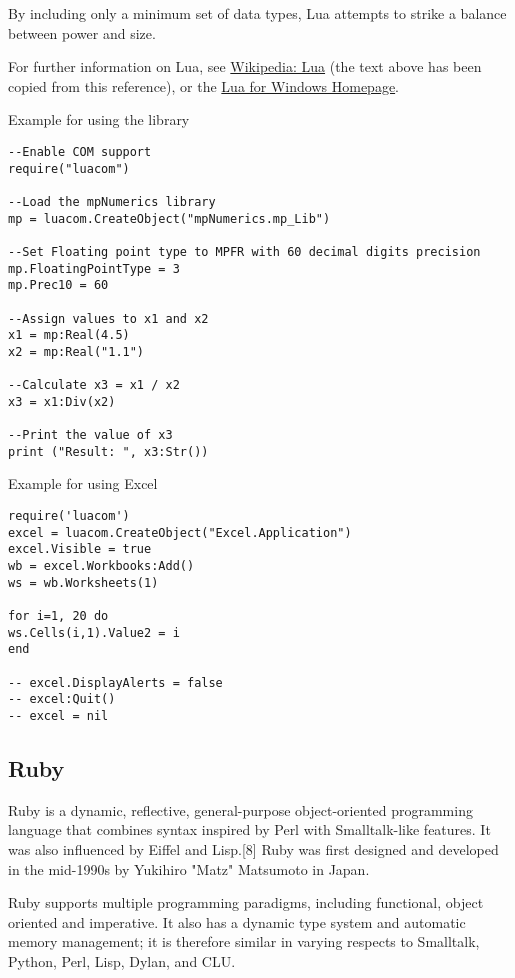 \vpara
By including only a minimum set of data types, Lua attempts to strike a balance between power and size.

For further information on Lua, see \href{http://en.wikipedia.org/wiki/Lua_(programming_language)}{Wikipedia: Lua} (the text above has been copied from this reference), or the  \href{http://code.google.com/p/luaforwindows/}{Lua for Windows Homepage}.


\vpara
Example for using the library

\begin{lstlisting}
--Enable COM support
require("luacom")

--Load the mpNumerics library
mp = luacom.CreateObject("mpNumerics.mp_Lib")

--Set Floating point type to MPFR with 60 decimal digits precision
mp.FloatingPointType = 3
mp.Prec10 = 60

--Assign values to x1 and x2
x1 = mp:Real(4.5)
x2 = mp:Real("1.1")

--Calculate x3 = x1 / x2
x3 = x1:Div(x2)

--Print the value of x3
print ("Result: ", x3:Str())
\end{lstlisting}


\vpara
Example for using Excel

\begin{lstlisting}
require('luacom')
excel = luacom.CreateObject("Excel.Application")
excel.Visible = true
wb = excel.Workbooks:Add()
ws = wb.Worksheets(1)

for i=1, 20 do
ws.Cells(i,1).Value2 = i
end

-- excel.DisplayAlerts = false
-- excel:Quit()
-- excel = nil
\end{lstlisting}



\newpage
\subsection{Ruby}
Ruby is a dynamic, reflective, general-purpose object-oriented programming language that combines syntax inspired by Perl with Smalltalk-like features. It was also influenced by Eiffel and Lisp.[8] Ruby was first designed and developed in the mid-1990s by Yukihiro "Matz" Matsumoto in Japan.

\vpara
Ruby supports multiple programming paradigms, including functional, object oriented and imperative. It also has a dynamic type system and automatic memory management; it is therefore similar in varying respects to Smalltalk, Python, Perl, Lisp, Dylan, and CLU.

